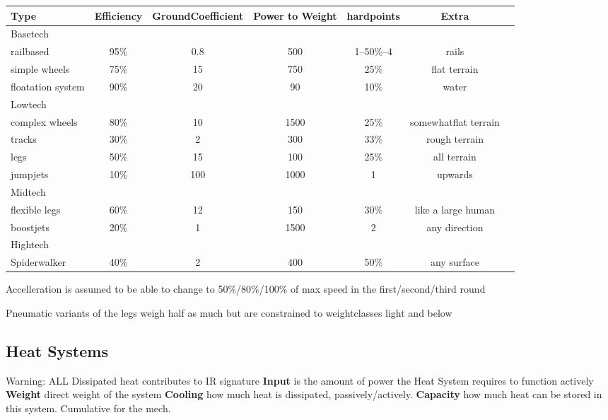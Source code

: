 \begin{tabular}{l|cccccl}
    Type    & Efficiency & GroundCoefficient & Power to Weight & hardpoints &Extra\\
    \hline
    Basetech\\
    railbased            & 95\%& 0.8 & 500 & 1--50\%--4 & rails \\
    simple wheels        & 75\% & 15 & 750 & 25\% & flat terrain \\
    floatation system    & 90\% & 20 &  90 & 10\% & water\\
    \hline
    Lowtech\\
    complex wheels       & 80\% & 10 & 1500 & 25\% &  somewhatflat terrain \\
    tracks               & 30\% & 2 & 300 & 33\% & rough terrain\\
    legs                 & 50\% & 15 & 100 & 25\% & all terrain\\
    jumpjets             & 10\% & 100 & 1000 & 1 & upwards\\
    \hline
    Midtech\\
    flexible legs        & 60\% & 12 & 150 & 30\% &  like a large human\\
    boostjets            & 20\% & 1 & 1500 & 2 &  any direction\\
    \hline Hightech\\
    Spiderwalker         & 40\% & 2 & 400 & 50\% & any surface
\end{tabular}

Accelleration is assumed to be able to change to 50\%/80\%/100\% of max speed  in the first/second/third round\par
Pneumatic variants of the legs weigh half as much but are constrained to weightclasses light and below\par

\subsection{Heat Systems}\label{subsec:heat-systems}
Warning: ALL Dissipated heat contributes to IR signature
\textbf{Input} is the amount of power the Heat System requires to function actively
\textbf{Weight} direct weight of the system
\textbf{Cooling} how much heat is dissipated, passively/actively.
\textbf{Capacity} how much heat can be stored in this system.
Cumulative for the mech.

